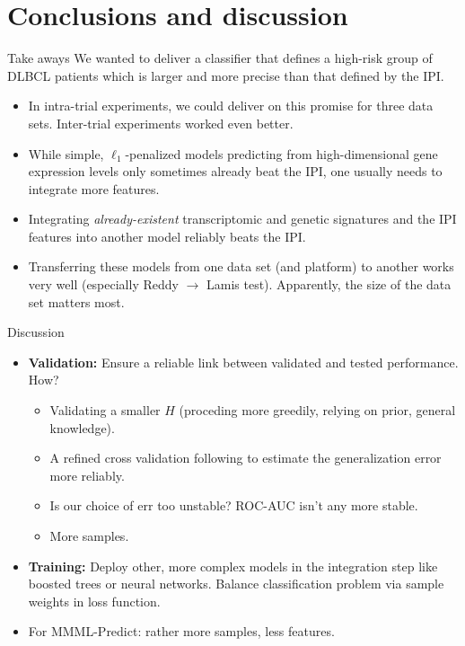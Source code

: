 \documentclass[10pt, aspectratio=169]{beamer}
\begin{document}
\section{Conclusions and discussion}
\begin{frame}{Take aways}
  We wanted to deliver a classifier that defines a high-risk group of DLBCL 
  patients which is larger and more precise than that defined by the IPI.
  \begin{itemize}
    \item In intra-trial experiments, we could deliver on this promise for three 
      data sets. Inter-trial experiments worked even better.
    \pause
    \item While simple, $\ell_1$-penalized models predicting from 
      high-dimensional gene expression levels only sometimes already beat 
      the IPI, one usually needs to integrate more features.
    \pause
    \item Integrating \textit{already-existent} transcriptomic and genetic 
      signatures and the IPI features into another model reliably beats the IPI.
    \pause
    \item Transferring these models from one data set (and platform) to another
      works very well (especially Reddy $\to$ Lamis test). Apparently, the
      size of the data set matters most.
  \end{itemize}
\end{frame}

\begin{frame}{Discussion}
  \begin{itemize}
    \item \textbf{Validation:} Ensure a reliable link between validated and 
      tested performance. How? \pause
      \begin{itemize}
        \item Validating a smaller $H$ (proceding more greedily, relying on 
          prior, general knowledge).
        \item A refined cross validation following \citep{nested-cv-hastie} to 
          estimate the generalization error more reliably.
        \item Is our choice of $\text{err}$ too unstable? ROC-AUC isn't any 
          more stable.
        \item More samples.
      \end{itemize}
    \pause
    \item \textbf{Training:} Deploy other, more complex models in the 
      integration step like boosted trees or neural networks. Balance 
      classification problem via sample weights in loss function.
    \pause
    \item For MMML-Predict: rather more samples, less features.
  \end{itemize}
\end{frame}
\end{document}
